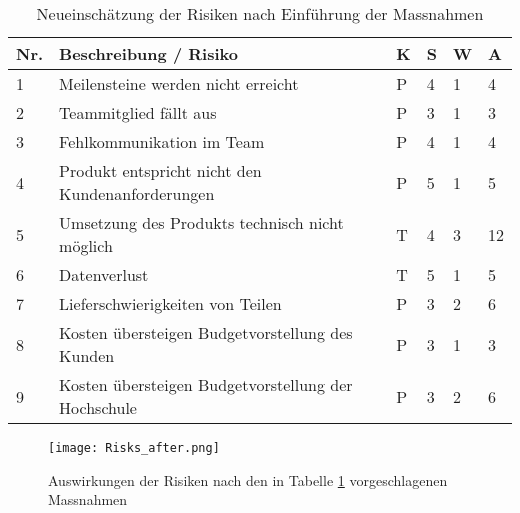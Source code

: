 \vspace{1em}

\begin{table}[htb]
	\begin{tabularx}{\textwidth}{|l|X|l|l|l||l|}
		\hline
		\textbf{Nr.} & \textbf{Beschreibung / Risiko} & \textbf{K} & \textbf{S} & \textbf{W} & \textbf{A} \\
		\hline
		1 & Meilensteine werden nicht erreicht & P & 4 & 1 & 4 \\
		\hline
		2 & Teammitglied fällt aus & P & 3 & 1 & 3 \\
		\hline
		3 & Fehlkommunikation im Team & P & 4 & 1 & 4 \\
		\hline
		4 & Produkt entspricht nicht den Kundenanforderungen & P & 5 & 1 & 5 \\
		\hline
		5 & Umsetzung des Produkts technisch nicht möglich & T & 4 & 3 & 12 \\
		\hline
		6 & Datenverlust & T & 5 & 1 & 5 \\
		\hline
		7 & Lieferschwierigkeiten von Teilen & P & 3 & 2 & 6 \\
		\hline
		8 & Kosten übersteigen Budgetvorstellung des Kunden & P & 3 & 1 & 3\\
		\hline
		9 & Kosten übersteigen Budgetvorstellung der Hochschule & P & 3 & 2 & 6\\
		\hline
	\end{tabularx}
	\caption{Neueinschätzung der Risiken nach Einführung der Massnahmen}
	\label{tbl:Massnahmen}
\end{table}

\vspace{1em}

\begin{figure}[htb]
	\centering
	\texttt{[image: Risks\_after.png]}
	\caption{Auswirkungen der Risiken nach den in Tabelle \ref{tbl:Massnahmen} vorgeschlagenen Massnahmen}
\end{figure}
